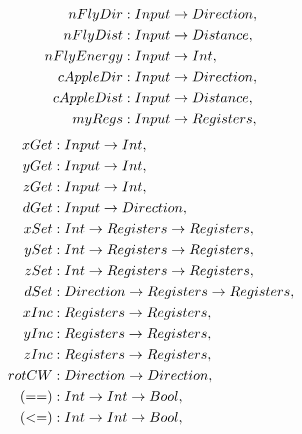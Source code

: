 \documentclass[12pt,a4paper]{report}
\begin{document}
\begin{align*}
nFlyDir          &: Input \rightarrow Direction                             ,\\                      
nFlyDist         &: Input \rightarrow Distance                              ,\\                    
nFlyEnergy       &: Input \rightarrow Int                                   ,\\              
cAppleDir        &: Input \rightarrow Direction                             ,\\          
cAppleDist       &: Input \rightarrow Distance                              ,\\        
myRegs           &: Input \rightarrow Registers                             ,\\         
\end{align*}
\begin{align*}
xGet             &: Input \ar Int                                   ,\\     
yGet             &: Input \ar Int                                   ,\\     
zGet             &: Input \ar Int                                   ,\\     
dGet             &: Input \ar Direction                             ,\\          
xSet             &: Int \ar Registers \ar Registers                 ,\\          
ySet             &: Int \ar Registers \ar Registers                 ,\\          
zSet             &: Int \ar Registers \ar Registers                 ,\\          
dSet             &: Direction \ar Registers \ar Registers           ,\\                
xInc             &: Registers \ar Registers                         ,\\              
yInc             &: Registers \ar Registers                         ,\\              
zInc             &: Registers \ar Registers                         ,\\              
rotCW            &: Direction \ar Direction                         ,\\                                                             
(==)             &: Int \ar Int \ar Bool                            ,\\                                      
(<=)             &: Int \ar Int \ar Bool                            ,\\               

\end{align*}
\end{document}
